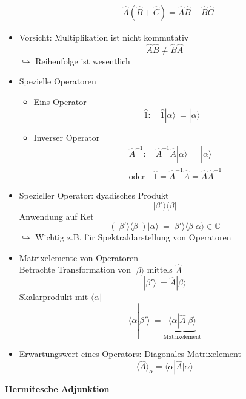\documentclass[10pt,article,colorback,accentcolor=tud9d]{scrartcl}
\begin{document}
\begin{itemize}
\begin{equation}
\begin{aligned}
  &\hat{A}(\hat{B} + \hat{C}) = \hat{A}\hat{B} + \hat{B}\hat{C}
\end{aligned}
\end{equation}
\item Vorsicht: Multiplikation ist nicht kommutativ
\begin{equation}
\hat{A}\hat{B} \not= \hat{B}\hat{A}
\end{equation}
$\hookrightarrow$ Reihenfolge ist wesentlich
\item Spezielle Operatoren
  \begin{itemize}
  \item Eins-Operator 
   \begin{equation}
  \hat{1}: \quad \hat{1}\left|\right. \alpha \rangle  \ = \left|\right. \alpha \rangle 
  \end{equation}
  \item Inverser Operator 
  \begin{equation}
  \begin{aligned}
  &\hat{A}^{-1}:\quad {\hat{A}}^{-1} \hat{A}\left|\right. \alpha \rangle  \ = \left|\right
. \alpha \rangle \\
  &\text{oder} \quad \hat{1} = {\hat{A}}^{-1}\hat{A} = \hat{A} {\hat{A}}^{-1}
  \end{aligned}
  \end{equation}
  \end{itemize}
\item Spezieller Operator: dyadisches Produkt
  \begin{equation}
  \left|\right. \beta' \rangle \langle \beta\left|\right.
  \end{equation}
  Anwendung auf Ket
  \begin{equation}
  (\left|\right. \beta' \rangle \langle \beta\left|\right.)\left|\right.\alpha\rangle  \ = \left|
\right.\beta'\rangle \langle \beta\left|\right.\alpha\rangle  \in \mathbb{C}
  \end{equation}
  $\hookrightarrow$ Wichtig z.B. für Spektraldarstellung von Operatoren
\item Matrixelemente von Operatoren\\
  Betrachte Transformation von $\left|\right. \beta \rangle $ mittels $\hat{A}$
  \begin{equation}
  \left|\right. \beta'\rangle  \ = \hat{A}\left|\right. \beta\rangle 
  \end{equation}
  Skalarprodukt mit $\langle \alpha \left|\right.$
  \begin{equation}
  \langle \alpha\left|\right.\beta'\rangle  \ = \underbrace{\langle \alpha\left|\right.\hat{A}\left
|\right.\beta\rangle }_{\text{Matrixelement}}
  \end{equation}
\item Erwartungswert eines Operators: Diagonales Matrixelement
  \begin{equation}
  \langle\hat{A}\rangle _\alpha = \langle \alpha \left|\right.\hat{A}| \alpha\rangle 
  \end{equation}
 
\end{itemize}
\textbf{Hermitesche Adjunktion}
 
\end{document}
